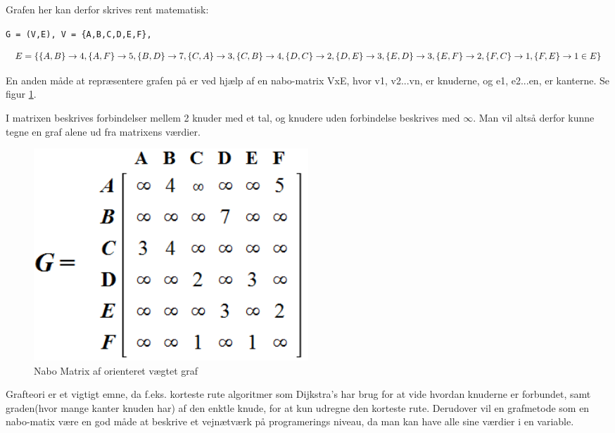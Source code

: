Grafen her kan derfor skrives rent matematisk:

\vspace{5mm}

\verb!G = (V,E), V = {A,B,C,D,E,F},! 

\vspace{5mm}

\begin{equation}\label{grafteori}
E = \{ \{A,B\} \rightarrow 4, \{A,F\} \rightarrow 5, \{B,D\} \rightarrow 7, \{C,A\} \rightarrow 3, \{C,B\} \rightarrow 4, \{D,C\} \rightarrow 2, \{D,E\}\\ \rightarrow 3, \{E,D\} \rightarrow 3, \{E,F\} \rightarrow 2, \{F,C\} \rightarrow 1, \{F,E\} \rightarrow 1 \in  E\}
\end{equation}

\vspace{5mm}

En anden måde at repræsentere grafen på er ved hjælp af en nabo-matrix VxE, hvor v1, v2...vn, er knuderne, og e1, e2...en, er kanterne. Se figur \ref{fig:adjacency-matrix-weighted-directed-graph}. 

I matrixen beskrives forbindelser mellem 2 knuder med et tal, og knudere uden forbindelse beskrives med $\infty$. Man vil altså derfor kunne tegne en graf alene ud fra matrixens værdier.

\begin{figure}[H]
\begin{adjustbox}{width=0.5\textwidth,center=\textwidth}
\centering
\includegraphics[width=0.5\textwidth]{Pictures/Teoriafsnit/Figurfiler/adjacency_matrix_weighted_directed_graph.PNG}
\end{adjustbox}
\caption{Nabo Matrix af orienteret vægtet graf}
\label{fig:adjacency-matrix-weighted-directed-graph}
\end{figure}

Grafteori er et vigtigt emne, da f.eks. korteste rute algoritmer som Dijkstra's har brug for at vide hvordan knuderne er forbundet, samt graden(hvor mange kanter knuden har) af den enktle knude, for at kun udregne den korteste rute. Derudover vil en grafmetode som en nabo-matix være en god måde at beskrive et vejnætværk på programerings niveau, da man kan have alle sine værdier i en variable.



